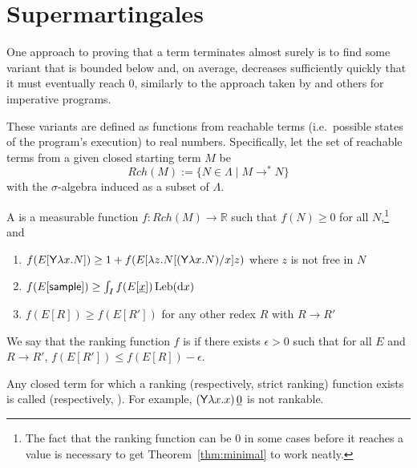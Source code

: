 \section{Supermartingales}
\label{sec:supermartingales}

One approach to proving that a term terminates almost surely is to find some variant that is bounded below and, on average, decreases sufficiently quickly that it must eventually reach 0, similarly to the approach taken by 
\cite{DBLP:conf/popl/FioritiH15} and others for imperative programs.

These variants are defined as functions from reachable terms (i.e.~possible states of the program's execution) to real numbers. 
Specifically, let the set of reachable terms from a given closed starting term $M$ be 
\[
\mathit{Rch}(M) := \{N \in \Lambda \mid M \to^* N \}
\] 
with the $\sigma$-algebra induced as a subset of $\Lambda$.

\begin{definition}\rm
\label{def:ranking function}
A  is a measurable function $f:\mathit{Rch}(M) \to \mathbb{R}$ such that $f(N) \geq 0$ for all $N$,\footnote{The fact that the ranking function can be 0 in some cases before it reaches a value is necessary to get Theorem~\ref{thm:minimal} to work neatly.} and
\begin{enumerate}
    \item $f(E[\mathsf{Y} \lambda x. N]) \geq 1+ f(E[\lambda z. N[(\mathsf{Y} \lambda x. N)/x] z)$ where $z$ is not free in $N$
    \item $f(E[\mathsf{sample}]) \geq \int_I f(E[\underline{x}]) \, \mathrm{Leb}(\mathrm{d}x)$
    \item $f(E[R]) \geq f(E[R'])$ for any other redex $R$ with $R \to R'$
\end{enumerate}
\iffalse
\lo{@Andrew: As defined, ranking function $f$ is not required to satisfy: $f(N) = 0$ iff $N$ is a value. But for AST analysis, we always require $f$ to satisfy this property. It seems cleaner to include this in the definition.} 
\akr{The fact that the ranking function can be 0 in some cases before it reaches a value is necessary to get Theorem~\ref{thm:minimal} to work neatly.}
\lo{OK. Let's leave Definition~\ref{def:ranking function} as it is.}
\fi
We say that the ranking function $f$ is  if there exists $\epsilon > 0$ such that for all $E$ and $R \to R'$, $f(E[R']) \leq f(E[R]) - \epsilon$.

Any closed term for which a ranking (respectively, strict ranking) function exists is called  (respectively, ). 
For example, $(\mathsf{Y} \lambda x.x) \, \underline 0$ is not rankable.
\end{definition}

